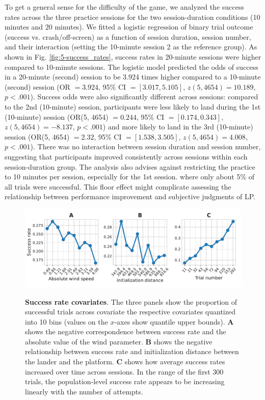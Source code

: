 To get a general sense for the difficulty of the game, we analyzed the success rates across the three practice sessions for the two session-duration conditions (10 minutes and 20 minutes). We fitted a logistic regression of binary trial outcome (success vs. crash/off-screen) as a function of session duration, session number, and their interaction (setting the 10-minute session 2 as the reference group). As shown in Fig. \ref{fig:5-success_rates}, success rates in 20-minute sessions were higher compared to 10-minute sessions. The logistic model predicted the odds of success in a 20-minute (second) session to be 3.924 times higher compared to a 10-minute (second) session (\ac{OR} $=3.924$, 95\% \ac{CI} $=[3.017, 5.105]$, $z(5, 4654)=10.189$, $p<.001$). Success odds were also significantly different across sessions: compared to the 2nd (10-minute) session, participants were less likely to land during the 1st (10-minute) session (\ac{OR}(5, 4654) $=0.244$, 95\% \ac{CI} $=[0.174, 0.343]$, $z(5, 4654)=-8.137$, $p<.001$) and more likely to land in the 3rd (10-minute) session (\ac{OR}(5, 4654) $=2.32$, 95\% \ac{CI} $=[1.538, 3.505]$, $z(5, 4654)=4.008$, $p<.001$). There was no interaction between session duration and session number, suggesting that participants improved consistently across sessions within each session-duration group. The analysis also advises against restricting the practice to 10 minutes per session, especially for the 1st session. where only about 5\% of all trials were successful. This floor effect might complicate assessing the relationship between performance improvement and subjective judgments of \ac{LP}.  

\begin{figure}[tbh]
    \centering
    {\includegraphics[width=\linewidth]{Figures/c5/init_param_effects.pdf}}
    \caption[]{\textbf{Success rate covariates}. The three panels show the proportion of successful trials across covariate the respective covariates quantized into 10 bins (values on the $x$-axes show quantile upper bounds). \textbf{A} shows the negative correspondence between success rate and the absolute value of the wind parameter. \textbf{B} shows the negative relationship between success rate and initialization distance between the lander and the platform. \textbf{C} shows how average success rates increased over time across sessions. In the range of the first 300 trials, the population-level success rate appears to be increasing linearly with the number of attempts.}\label{fig:5-init_param_effects}
\end{figure}

